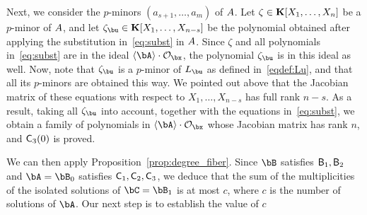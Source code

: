 \documentclass[12pt]{article}
\begin{document}
Next, we consider the $p$-minors $(a_{s+1},\dots,a_m)$ of ${A}$. Let
$\zeta \in\mathbf{K}[X_1,\dots,X_n]$ be a $p$-minor of ${A}$, and let
$\zeta_\bu \in \KK[X_1,\dots,X_{n-s}]$ be the polynomial obtained
after applying the substitution in~\eqref{eq:subst} in ${A}$. Since
$\zeta$ and all polynomials in~\eqref{eq:subst} are in the ideal
$\langle \bA \rangle \cdot \mathcal{O}_\bx$, the polynomial
$\zeta_\bu$ is in this ideal as well. Now, note that $\zeta_\bu$ is a
$p$-minor of $\mL_\bu$ as defined in~\eqref{eqdef:Lu}, and that all
its $p$-minors are obtained this way. We pointed out above that the
Jacobian matrix of these equations with respect to $X_1,\dots,X_{n-s}$
has full rank $n-s$. As a result, taking all $\zeta_\bu$ into account,
together with the equations in~\eqref{eq:subst}, we obtain 
a family of polynomials in $\langle \bA \rangle \cdot \mathcal{O}_\bx$ 
whose Jacobian matrix has rank $n$, and $\mathsf{C}_3(0)$ is proved.

\medskip

We can then apply Proposition~\ref{prop:degree_fiber}. Since $\bB$
satisfies $\mathsf{B}_1,\mathsf{B}_2$ and $\bA=\bB_0$ satisfies
$\mathsf{C}_1,\mathsf{C}_2,\mathsf{C}_3$, we deduce that the sum of the
multiplicities of the isolated solutions of $\bC=\bB_1$ is at most
$c$, where $c$ is the number of solutions of $\bA$. Our next step
is to establish the value of $c$
\end{document}
